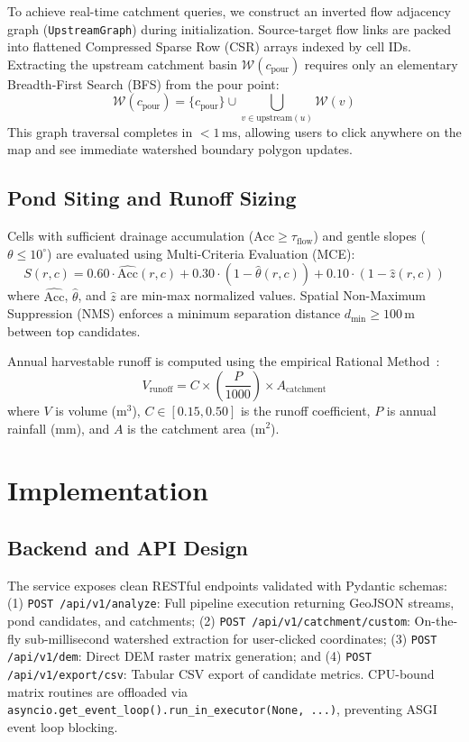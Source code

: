 \documentclass[manuscript,screen,review]{acmart}
\begin{document}
To achieve real-time catchment queries, we construct an inverted flow adjacency graph (\texttt{UpstreamGraph}) during initialization. Source-target flow links are packed into flattened Compressed Sparse Row (CSR) arrays indexed by cell IDs. Extracting the upstream catchment basin $\mathcal{W}(c_{\text{pour}})$ requires only an elementary Breadth-First Search (BFS) from the pour point:
\begin{equation}
    \mathcal{W}(c_{\text{pour}}) = \{c_{\text{pour}}\} \cup \bigcup_{v \in \text{upstream}(u)} \mathcal{W}(v)
\end{equation}
This graph traversal completes in $<1\,\text{ms}$, allowing users to click anywhere on the map and see immediate watershed boundary polygon updates.

\subsection{Pond Siting and Runoff Sizing}
Cells with sufficient drainage accumulation ($\text{Acc} \ge \tau_{\text{flow}}$) and gentle slopes ($\theta \le 10^\circ$) are evaluated using Multi-Criteria Evaluation (MCE):
\begin{equation}
    S(r, c) = 0.60 \cdot \widehat{\text{Acc}}(r, c) + 0.30 \cdot (1 - \widehat{\theta}(r, c)) + 0.10 \cdot (1 - \widehat{z}(r, c))
\end{equation}
where $\widehat{\text{Acc}}$, $\widehat{\theta}$, and $\widehat{z}$ are min-max normalized values. Spatial Non-Maximum Suppression (NMS) enforces a minimum separation distance $d_{\min} \ge 100\,\text{m}$ between top candidates.

Annual harvestable runoff is computed using the empirical Rational Method~\cite{chow1988applied}:
\begin{equation}
    V_{\text{runoff}} = C \times \left(\frac{P}{1000}\right) \times A_{\text{catchment}}
\end{equation}
where $V$ is volume ($\text{m}^3$), $C \in [0.15, 0.50]$ is the runoff coefficient, $P$ is annual rainfall ($\text{mm}$), and $A$ is the catchment area ($\text{m}^2$).

\section{Implementation}
\label{sec:implementation}

\subsection{Backend and API Design}
The service exposes clean RESTful endpoints validated with Pydantic schemas:
(1) \texttt{POST /api/v1/analyze}: Full pipeline execution returning GeoJSON streams, pond candidates, and catchments;
(2) \texttt{POST /api/v1/catchment/custom}: On-the-fly sub-millisecond watershed extraction for user-clicked coordinates;
(3) \texttt{POST /api/v1/dem}: Direct DEM raster matrix generation; and
(4) \texttt{POST /api/v1/export/csv}: Tabular CSV export of candidate metrics.
CPU-bound matrix routines are offloaded via \texttt{asyncio.get\_event\_loop().run\_in\_executor(None, ...)}, preventing ASGI event loop blocking.
\end{document}
